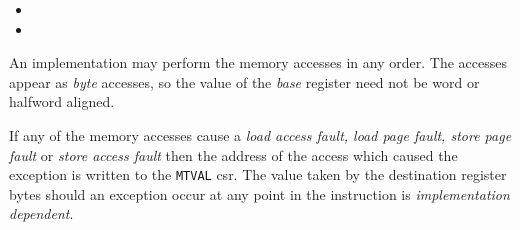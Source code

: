 \begin{itemize}
\item {}
\item {}
\end{itemize}


An implementation may perform the memory accesses in any order. The accesses
appear as {\em byte} accesses, so the value of the {\em base} register
need not be word or halfword aligned.

If any of the memory accesses cause
a {\em load access fault, load page fault, store page fault} or
{\em store access fault} then the address of the access which caused the
exception is written to the {\tt MTVAL} csr. The value taken by the
destination register bytes should an exception occur at any point in the
instruction is {\em implementation dependent}.

